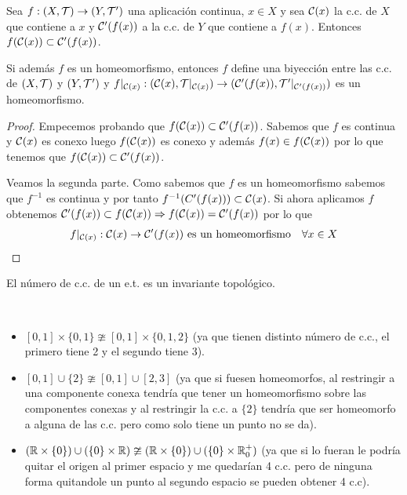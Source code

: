 \begin{teo}
    Sea $f:(X, \mathcal{T})\to (Y, \mathcal{T}')$ una aplicación continua, $x\in X$ y sea $\mathcal{C}(x)$ la c.c. de $X$ que contiene a $x$ y $\mathcal{C}'(f(x))$ a la c.c. de $Y$ que contiene a $f(x)$. Entonces $f(\mathcal{C}(x))\subset \mathcal{C}'(f(x))$. 
    
    Si además $f$ es un homeomorfismo, entonces $f$ define una biyección entre las c.c. de $(X, \mathcal{T})$ y $(Y, \mathcal{T}')$ y $f|_{\mathcal{C}(x)}:(\mathcal{C}(x), \mathcal{T}|_{\mathcal{C}(x)})\to (\mathcal{C}'(f(x)), \mathcal{T}'|_{\mathcal{C}'(f(x))})$ es un homeomorfismo.

    \begin{proof}
        Empecemos probando que $f(\mathcal{C}(x))\subset \mathcal{C}'(f(x))$. Sabemos que $f$ es continua y $\mathcal{C}(x)$ es conexo luego $f(\mathcal{C}(x))$ es conexo y además $f(x)\in f(\mathcal{C}(x))$ por lo que tenemos que $f(\mathcal{C}(x))\subset \mathcal{C}'(f(x))$.

        Veamos la segunda parte. Como sabemos que $f$ es un homeomorfismo sabemos que $f^{-1}$ es continua y por tanto $f^{-1}(C'(f(x)))\subset \mathcal{C}(x)$. Si ahora aplicamos $f$ obtenemos $\mathcal{C}'(f(x))\subset f(\mathcal{C}(x)) \Rightarrow f(\mathcal{C}(x))=\mathcal{C}'(f(x))$ por lo que 
        \begin{align*}
            f|_{\mathcal{C}(x)}: \mathcal{C}(x)\to \mathcal{C}'(f(x))\text{ es un homeomorfismo } \ \ \forall x \in X
        \end{align*}
    \end{proof}
\end{teo}

\begin{coro}
    El número de c.c. de un e.t. es un invariante topológico.
    \endsquare
\end{coro}

\begin{ejemplo}\
    \begin{itemize}
        \item $[0,1]\times \{0,1\} \ncong [0,1]\times \{0,1,2\}$ (ya que tienen distinto número de c.c., el primero tiene 2 y el segundo tiene 3).
        \item $[0,1]\cup\{2\} \ncong [0,1]\cup [2,3]$ (ya que si fuesen homeomorfos, al restringir a una componente conexa tendría que tener un homeomorfismo sobre las componentes conexas y al restringir la c.c. a $\{2\}$ tendría que ser homeomorfo a alguna de las c.c. pero como solo tiene un punto no se da).
        \item $(\mathbb{R}\times \{0\})\cup (\{0\}\times \mathbb{R}) \ncong (\mathbb{R}\times \{0\})\cup (\{0\}\times \mathbb{R}_0^+)$ (ya que si lo fueran le podría quitar el origen al primer espacio y me quedarían 4 c.c. pero de ninguna forma quitandole un punto al segundo espacio se pueden obtener 4 c.c).
    \end{itemize}
\end{ejemplo}

